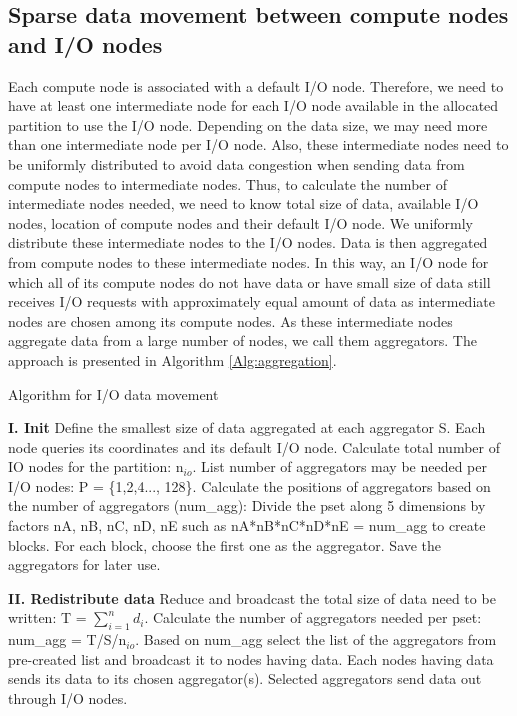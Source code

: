 \documentclass[final,5p,times]{elsarticle}
\begin{document}
\subsection{Sparse data movement between compute nodes and I/O nodes}
\label{sec:stagingandio}
Each compute node is associated with a default I/O node. Therefore, we need to have at least one intermediate node for each I/O node available in the allocated partition to use the I/O node.
Depending on the data size, we may need more than one intermediate node per I/O node. Also, these intermediate nodes need to be uniformly distributed to avoid data congestion when sending data from compute nodes to intermediate nodes. Thus, to calculate the number of intermediate nodes needed, we need to know total size of data, available I/O nodes, location of compute nodes and their default I/O node. We uniformly distribute these intermediate nodes to the I/O nodes. Data is then aggregated from compute nodes to these intermediate nodes. In this way, an I/O node for which all of its compute nodes do not have data or have small size of data still receives I/O requests with approximately equal amount of data as intermediate nodes are chosen among its compute nodes. As these intermediate nodes aggregate data from a large number of nodes, we call them aggregators. The approach is presented in Algorithm \ref{Alg:aggregation}.

\begin{algorithm}
\caption{Algorithm for I/O data movement}
\begin{algorithmic}
\STATE \textbf{I. Init}
\STATE Define the smallest size of data aggregated at each aggregator S.
\STATE Each node queries its coordinates and its default I/O node.
\STATE Calculate total number of IO nodes for the partition: n$_{io}$.
\STATE List number of aggregators may be needed per I/O nodes: P = \{1,2,4..., 128\}.
\STATE Calculate the positions of aggregators based on the number of aggregators (num\_agg):
\STATE Divide the pset along 5 dimensions by factors nA, nB, nC, nD, nE such as nA*nB*nC*nD*nE = num\_agg to create blocks.
\STATE For each block, choose the first one as the aggregator.
\STATE Save the aggregators for later use.
\ENDFOR

\STATE \textbf{II. Redistribute data}
\STATE Reduce and broadcast the total size of data need to be written: T = $\sum_{i=1}^{n}d_i$.
\STATE Calculate the number of aggregators needed per pset: num\_agg = T/S/n$_{io}$.
\STATE Based on num\_agg select the list of the aggregators from pre-created list and broadcast it to nodes having data.
\STATE Each nodes having data sends its data to its chosen aggregator(s).
\STATE Selected aggregators send data out through I/O nodes.
\end{algorithmic}
\label{Alg:aggregation}
\end{algorithm}
\end{document}
